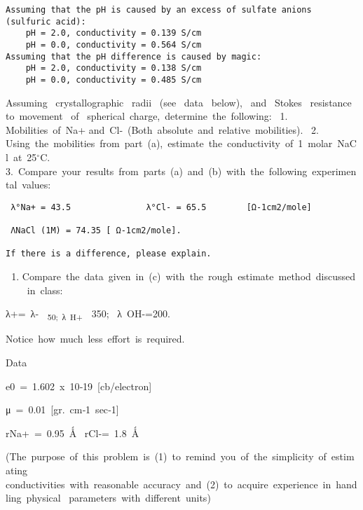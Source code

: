 \documentclass{article}
\begin{document}
    \begin{Verbatim}[commandchars=\\\{\}]
Assuming that the pH is caused by an excess of sulfate anions (sulfuric acid):
	pH = 2.0, conductivity = 0.139 S/cm
	pH = 0.0, conductivity = 0.564 S/cm
Assuming that the pH difference is caused by magic:
	pH = 2.0, conductivity = 0.138 S/cm
	pH = 0.0, conductivity = 0.485 S/cm
    \end{Verbatim}

    Assuming~ crystallographic~ radii~ (see~ data~ below),~ and~ Stokes~
resistance~ to~movement~ of~ spherical~charge,~determine~the~following:~
1. Mobilities~of~Na+ and~Cl‐~(Both~absolute~and~relative~mobilities).~
2.
Using~the~mobilities~from~part~(a),~estimate~the~conductivity~of~1~molar~NaCl~at~25$^\circ$C.~
3.~Compare~your~results~from~parts~(a)~and~(b)~with~the~following~experimental~values:~

\begin{verbatim}
 λ°Na+ = 43.5               λ°Cl‐ = 65.5        [Ω‐1cm2/mole]
 
 ΛNaCl (1M) = 74.35 [ Ω‐1cm2/mole].
 
If there is a difference, please explain. 
\end{verbatim}

\begin{enumerate}
\def\labelenumi{\arabic{enumi}.}
\setcounter{enumi}{3}
\itemsep1pt\parskip0pt
\item
  Compare~the~data~given~in~(c)~with~the~rough~estimate~method~discussed~in~class:~
\end{enumerate}

λ+=~λ‐~\textsubscript{~50;~λ~H+~}~350;~ λ~OH-=200.

Notice~how~much~less~effort~is~required.~

Data

e0~=~1.602~x~10‐19~{[}cb/electron{]}

μ~=~0.01~{[}gr.~cm‐1~sec‐1{]}

rNa+~=~0.95~Ǻ~ rCl‐=~1.8~Ǻ~

(The~purpose~of~this~problem~is~(1)~to~remind~you~of~the~simplicity~of~estimating~
conductivities~with~reasonable~accuracy~and~(2)~to~acquire~experience~in~handling~physical~
parameters~with~different~units)~~
\end{document}
